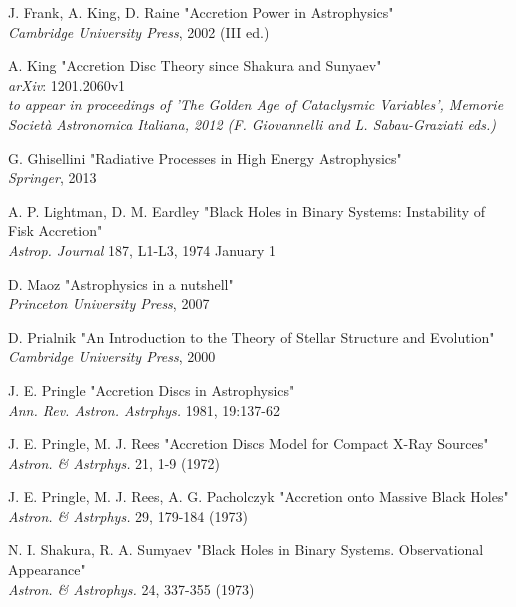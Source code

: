 \documentclass[a4paperbi]{article}
\begin{document}
\begin{thebibliography}{9}

	J. Frank, A. King, D. Raine
	"Accretion Power in Astrophysics"\\
	\textit{Cambridge University Press}, 2002 (III ed.)
	
	A. King 
	"Accretion Disc Theory since Shakura and Sunyaev"\\
	\textit{arXiv}: 1201.2060v1\\
	\textit{to appear in proceedings of 'The Golden Age of Cataclysmic Variables', Memorie Società Astronomica Italiana, 2012 (F. Giovannelli and L. Sabau-Graziati eds.)}
	
	G. Ghisellini
	"Radiative Processes in High Energy Astrophysics"\\
	\textit{Springer}, 2013
	
	A. P. Lightman, D. M. Eardley 
	"Black Holes in Binary Systems: Instability of Fisk Accretion"\\
	\textit{Astrop. Journal} 187, L1-L3, 1974 January 1
	
	D. Maoz
	"Astrophysics in a nutshell"\\
	\textit{Princeton University Press}, 2007
	
	D. Prialnik
	"An Introduction to the Theory of Stellar Structure and Evolution"\\
	\textit{Cambridge University Press}, 2000
	
	J. E. Pringle 
	"Accretion Discs in Astrophysics"\\
	\textit{Ann. Rev. Astron. Astrphys.} 1981, 19:137-62
	
	J. E. Pringle, M. J. Rees
	"Accretion Discs Model for Compact X-Ray Sources"\\
	\textit{Astron. \& Astrphys.} 21, 1-9 (1972)
	
	J. E. Pringle, M. J. Rees, A. G. Pacholczyk
	"Accretion onto Massive Black Holes"\\
	\textit{Astron. \& Astrphys.} 29, 179-184 (1973)
	
	N. I. Shakura, R. A. Sumyaev 
	"Black Holes in Binary Systems. Observational Appearance"\\
	\textit{Astron. \& Astrophys.} 24, 337-355 (1973)
	

\end{thebibliography}
\end{document}
